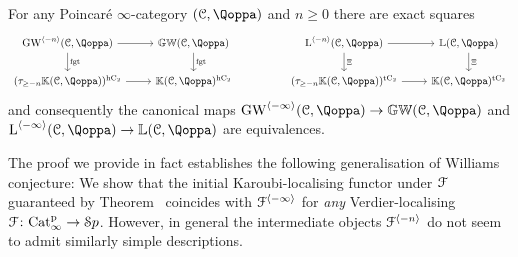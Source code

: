 \begin{theoremintrofour}
\label{theorem:intro-E}%
For any Poincaré $\infty$-category $(\C,\QF)$ and $n\geq 0$ there are exact squares
\[
\begin{tikzcd}
\GW^{\langle -n \rangle}(\C,\QF) \ar[r] \ar[d,"\fgt"] & \KGW(\C,\QF) \ar[d,"\fgt"] && \L^{\langle -n \rangle}(\C,\QF) \ar[r] \ar[d,"\Xi"] & \KL(\C,\QF) \ar[d,"\Xi"] \\
(\tau_{\geq -n} \KK(\C,\QF))^\hC \ar[r] & \KK(\C,\QF)^\hC && (\tau_{\geq -n} \KK(\C,\QF))^\tC \ar[r] & \KK(\C,\QF)^\tC
\end{tikzcd}
\]
and consequently the canonical maps $\GW^{\langle -\infty \rangle}(\C,\QF) \to \KGW(\C, \QF)$ and $\L^{\langle-\infty\rangle}(\C,\QF)\to \KL(\C,\QF)$ are equivalences.
\end{theoremintrofour}

The proof we provide in fact establishes the following generalisation of Williams conjecture: We show that the initial Karoubi-localising functor under $\mathcal{F}$ guaranteed by Theorem~ 
coincides with
$\mathcal{F}^{\langle -\infty \rangle}$ for \emph{any} Verdier-localising $\mathcal{F} \colon \mathrm{Cat}^{\mathrm p}_\infty \rightarrow {\mathcal Sp}$. However, in general the intermediate objects $\mathcal{F}^{\langle -n \rangle}$ do not seem to admit similarly simple descriptions.





